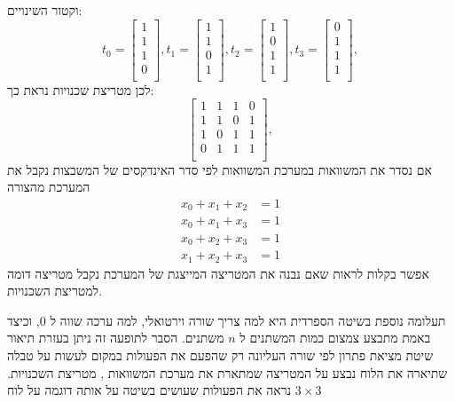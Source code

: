 \documentclass[12pt,leqno]{article}
\begin{document}
וקטור השינויים:
\[
   t_0 = 
    \begin{bmatrix}
        1 \\
        1 \\
        1 \\
        0 \\
    \end{bmatrix},
    t_1 = 
    \begin{bmatrix}
        1 \\
        1 \\
        0 \\
        1 \\
    \end{bmatrix},
    t_2 = 
    \begin{bmatrix}
        1 \\
        0 \\
        1 \\
        1 \\
    \end{bmatrix},
    t_3 = 
    \begin{bmatrix}
        0 \\
        1 \\
        1 \\
        1 \\
    \end{bmatrix},
\]
לכן
מטריצת שכנויות נראת כך:
\[
    \begin{bmatrix}
        1 & 1 & 1 &0 \\
        1 & 1 & 0 & 1 \\
        1 & 0 & 1 & 1 \\
        0 & 1 & 1 & 1 \\
    \end{bmatrix},
\]
אם נסדר את המשוואות במערכת המשוואות לפי סדר 
האינדקסים של המשבצות נקבל את המערכת מהצורה
\begin{align*}
    x_0 + x_1 + x_2 &= 1\\
    x_0 + x_1 + x_3 &= 1\\
    x_0 + x_2 + x_3 &= 1\\
    x_1 + x_2 + x_3 &= 1
\end{align*}
אפשר בקלות לראות שאם נבנה את המטריצה המייצגת של המערכת נקבל מטריצה דומה למטריצת השכנויות.

תעלומה נוספת בשיטה הספרדית היא למה צריך שורה וירטואלי, למה ערכה 
שווה ל
$0$,
וכיצד באמת מתבצע צמצום כמות המשתנים ל
$n$
משתנים.
הסבר לתופעה זה
ניתן בעזרת תיאור שיטת מציאת פתרון לפי שורה העליונה רק שהפעם את
הפעולות במקום לעשות על טבלה שתיארה את הלוח נבצע על המטריצה שמתארת את מערכת המשוואות 
,
מטריצת השכנויות.
נראה את הפעולות שעושים בשיטה על אותה דוגמה 
על לוח 
$3 \times 3$
\end{document}
